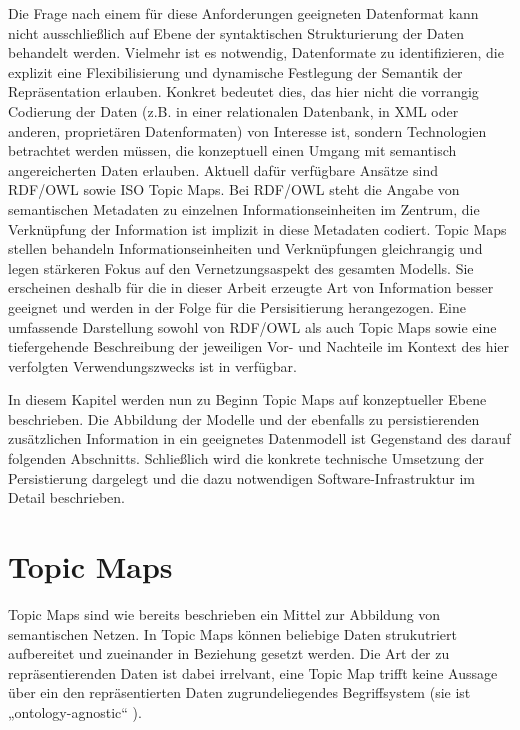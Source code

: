 Die Frage nach einem für diese Anforderungen geeigneten Datenformat kann nicht ausschließlich auf Ebene der syntaktischen Strukturierung der Daten behandelt werden. Vielmehr ist es notwendig, Datenformate zu identifizieren, die explizit eine Flexibilisierung und dynamische Festlegung der Semantik der Repräsentation erlauben. Konkret bedeutet dies, das hier nicht die vorrangig Codierung der Daten (z.B. in einer relationalen Datenbank, in \gls{XML} oder anderen, proprietären Datenformaten) von Interesse ist, sondern Technologien betrachtet werden müssen, die konzeptuell einen Umgang mit semantisch angereicherten Daten erlauben. Aktuell dafür verfügbare Ansätze sind \gls{RDF}/\gls{OWL} sowie ISO Topic Maps. Bei \gls{RDF}/\gls{OWL} steht die Angabe von semantischen Metadaten zu einzelnen Informationseinheiten im Zentrum, die Verknüpfung der Information ist implizit in diese Metadaten codiert. Topic Maps stellen behandeln Informationseinheiten und Verknüpfungen gleichrangig und legen stärkeren Fokus auf den Vernetzungsaspekt des gesamten Modells. Sie erscheinen deshalb für die in dieser Arbeit erzeugte Art von Information besser geeignet und werden in der Folge für die Persisitierung herangezogen. Eine umfassende Darstellung sowohl von \gls{RDF}/\gls{OWL} als auch Topic Maps sowie eine tiefergehende Beschreibung der jeweiligen Vor- und Nachteile im Kontext des hier verfolgten Verwendungszwecks ist in \citep{Oppl07} verfügbar.

In diesem Kapitel werden nun zu Beginn Topic Maps auf konzeptueller Ebene beschrieben. Die Abbildung der Modelle und der ebenfalls zu persistierenden zusätzlichen Information in ein geeignetes Datenmodell ist Gegenstand des darauf folgenden Abschnitts. Schließlich wird die konkrete technische Umsetzung der Persistierung dargelegt und die dazu notwendigen Software-Infrastruktur im Detail beschrieben.
 
\section{Topic Maps} %
\label{sec:topic_maps}

Topic Maps \citep{TMDM08} sind wie bereits beschrieben ein Mittel zur Abbildung von semantischen Netzen. In Topic Maps können beliebige Daten strukutriert aufbereitet und zueinander in Beziehung gesetzt werden. Die Art der zu repräsentierenden Daten ist dabei irrelvant, eine Topic Map trifft keine Aussage über ein den repräsentierten Daten zugrundeliegendes Begriffsystem (sie ist „ontology-agnostic“ \citep{Vatant04}).

